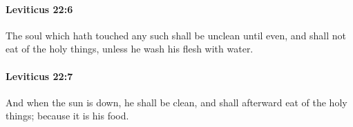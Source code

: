 		\paragraph{Leviticus 22:6} %
			\label{LEVITICUS-22-6}

			The soul which hath touched any such shall be unclean until even, and shall not eat of the holy things, unless he wash his flesh with water.


		\paragraph{Leviticus 22:7} %
			\label{LEVITICUS-22-7}

			And when the sun is down, he shall be clean, and shall afterward eat of the holy things; because it is his food.



